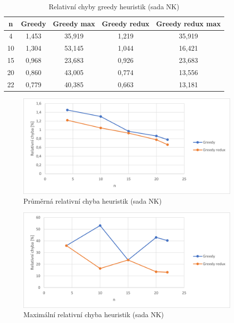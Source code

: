 \documentclass[12pt]{article}
\begin{document}
\begin{table}
    \begin{center}
         \begin{tabular}{|c | c | c | c | c|} 
         \hline
         n & Greedy & Greedy max & Greedy redux & Greedy redux max \\ [0.1ex] 
         \hline\hline
        4 & 1,453 & 35,919 & 1,219 & 35,919 \\
        \hline
        10 & 1,304 & 53,145 & 1,044 & 16,421 \\
        \hline
        15 & 0,968 & 23,683 & 0,926 & 23,683 \\
        \hline
        20 & 0,860 & 43,005 & 0,774 & 13,556 \\
        \hline
        22 & 0,779 & 40,385 & 0,663 & 13,181 \\
        \hline
        \end{tabular}
        \caption{Relativní chyby greedy heuristik (sada NK)} \label{tab:nk_greedy_error}
    \end{center}
\end{table}

\begin{figure}[ht]\centering
    \includegraphics[width=1\textwidth, keepaspectratio]{graphs/NK/heuristics/nk_greedy_avg.png}
    \caption{Průměrná relativní chyba heuristik (sada NK)}
    \label{fig:nk_greedy_avg}
\end{figure}

\begin{figure}[ht]\centering
    \includegraphics[width=1\textwidth, keepaspectratio]{graphs/NK/heuristics/nk_greedy_max.png}
    \caption{Maximální relativní chyba heuristik (sada NK)}
    \label{fig:nk_greedy_max}
\end{figure}
\end{document}
